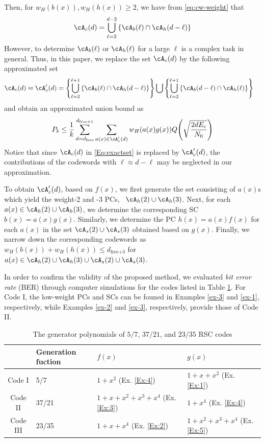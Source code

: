 Then, for $w_H(b(x)), w_H(h(x)) \geq 2$, we have from \eqref{eq:cw-weight} that
\begin{align}
\cA_c(d) = \bigcup_{\ell = 2}^{d-2} \left\{\cA_b(\ell) \cap \cA_h(d-\ell)\right\}
\label{Eq:exactset}
\end{align}
However, to determine $\cA_b(\ell)$ or $\cA_h(\ell)$ for a large $\ell$ is a complex task in general. Thus, in this paper, we replace the set $\cA_c(d)$ by the following approximated set %
\begin{equation}
\begin{split}
\cA_c(d) \approx \cA_c'(d) &= \left\{\bigcup_{\ell = 2}^{\ell+1} \left\{\cA_b(\ell) \cap \cA_h(d-\ell)\right\}\right\}\bigcup \left\{\bigcup_{\ell = 2}^{\ell+1} \left\{\cA_b(d-\ell) \cap \cA_h(\ell)\right\}\right\}
\end{split}
\label{setApprox}
\end{equation}
and obtain an approximated union bound as
\begin{align}
P_b \leq \frac{1}{k} \sum_{d=d_{\text{free}}}^{d_{\text{free}+1}} \sum_{a(x) \in \cA'_c(d)}w_H(a(x)g(x)) Q\Bigg( \sqrt{\frac{2dE_c}{N_0}}\Bigg)
\label{novelEq7}
\end{align}
Notice that since $\cA_c(d)$ in \eqref{Eq:exactset} is replaced by $\cA_c'(d)$, the contributions of the codewords with $\ell \approx d-\ell$ may be neglected in our approximation.

To obtain $\cA_c'(d)$, based on $f(x)$, we first generate the set consisting of $a(x)$s which yield the weight-2 and -3 PCs, \ie~$\cA_h(2)\cup\cA_h(3)$. Next, for each $a(x) \in \cA_h(2)\cup\cA_h(3)$, we determine the corresponding SC $b(x)=a(x)g(x)$. Similarly, we determine the PC $h(x)=a(x)f(x)$ for each $a(x)$ in the set $\cA_s(2)\cup\cA_s(3)$  obtained based on $g(x)$. Finally, we narrow down the corresponding codewords as $w_H(b(x))+w_H(h(x)) \leq d_{\text{free+3}}$ for $a(x) \in \cA_h(2)\cup\cA_h(3)\cup\cA_s(2)\cup\cA_s(3)$.

In order to confirm the validity of the proposed method, we evaluated {\it bit error rate} (BER) through computer simulations for the codes listed in Table \ref{TB:Codes}. For Code I, the low-weight PCs and SCs can be founed in Examples \ref{ex-3} and \ref{ex-1}, respectively, while Examples \ref{ex-2} and \ref{ex-3}, respectively, provide those of Code II.
\begin{table}[htbp]
	\caption{The generator polynomials of $5/7$, $37/21$, and $23/35$ RSC codes}
	\centering
	\begin{tabularx}{0.75\textwidth}{clll} 
		\toprule
			& Generation fuction & $f(x)$ & $g(x)$ \\ %
		\midrule
		Code I & 5/7 & $1+x^2$ (Ex. \ref{Ex:4}) & $1+x+x^2$ (Ex. \ref{Ex:1})\\
		Code II & 37/21 & $1+x+x^2+x^3+x^4$ (Ex. \ref{Ex:3})& $1+x^4$  (Ex. \ref{Ex:4})\\
		Code III & 23/35 & $1+x+x^4$ (Ex. \ref{Ex:2})& $1+x^2+x^3+x^4$  (Ex. \ref{Ex:5})\\
		\bottomrule
	\end{tabularx}
	\label{TB:Codes}
\end{table}


